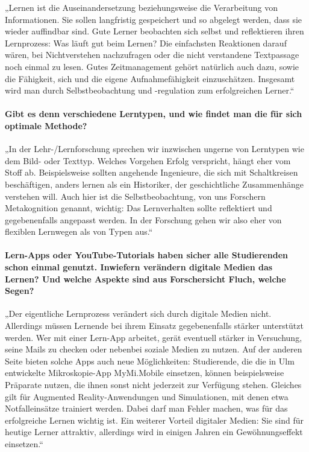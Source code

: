 „Lernen ist die Auseinandersetzung beziehungsweise die Verarbeitung von Informationen. Sie sollen langfristig gespeichert und so abgelegt werden, dass sie wieder auffindbar sind. Gute Lerner beobachten sich selbst und reflektieren ihren Lernprozess: Was läuft gut beim Lernen? Die einfachsten Reaktionen darauf wären, bei Nichtverstehen nachzufragen oder die nicht verstandene Textpassage noch einmal zu lesen. Gutes Zeitmanagement gehört natürlich auch dazu, sowie die Fähigkeit, sich und die eigene Aufnahmefähigkeit einzuschätzen. Insgesamt wird man durch Selbstbeobachtung und -regulation zum erfolgreichen Lerner.“ 

\paragraph{Gibt es denn verschiedene Lerntypen, und wie findet man die für sich optimale Methode?}

„In der Lehr-/Lernforschung sprechen wir inzwischen ungerne von Lerntypen wie dem Bild- oder Texttyp. Welches Vorgehen Erfolg verspricht, hängt eher vom Stoff ab. Beispielsweise sollten angehende Ingenieure, die sich mit Schaltkreisen beschäftigen, anders lernen als ein Historiker, der geschichtliche Zusammenhänge verstehen will. Auch hier ist die Selbstbeobachtung, von uns Forschern Metakognition genannt, wichtig: Das Lernverhalten sollte reflektiert und gegebenenfalls angepasst werden. In der Forschung gehen wir also eher von flexiblen Lernwegen als von Typen aus.“ 

\paragraph{Lern-Apps oder YouTube-Tutorials haben sicher alle Studierenden schon einmal genutzt. Inwiefern verändern digitale Medien das Lernen? Und welche Aspekte sind aus Forschersicht Fluch, welche Segen?}

„Der eigentliche Lernprozess verändert sich durch digitale Medien nicht. Allerdings müssen Lernende bei ihrem Einsatz gegebenenfalls stärker unterstützt werden. Wer mit einer Lern-App arbeitet, gerät eventuell stärker in Versuchung, seine Mails zu checken oder nebenbei soziale Medien zu nutzen. Auf der anderen Seite bieten solche Apps auch neue Möglichkeiten: Studierende, die die in Ulm entwickelte Mikroskopie-App MyMi.Mobile einsetzen, können beispielsweise Präparate nutzen, die ihnen sonst nicht jederzeit zur Verfügung stehen. Gleiches gilt für Augmented Reality-Anwendungen und Simulationen, mit denen etwa Notfalleinsätze trainiert werden. Dabei darf man Fehler machen, was für das erfolgreiche Lernen wichtig ist. Ein weiterer Vorteil digitaler Medien: Sie sind für heutige Lerner attraktiv, allerdings wird in einigen Jahren ein Gewöhnungseffekt einsetzen.“

